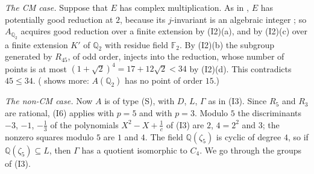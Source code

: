 \documentclass[11pt]{article}
\newcommand{\Q}{\mathbb Q}
\newcommand{\F}{\mathbb F}
\begin{document}
\emph{The CM case.} Suppose that \(E\) has complex multiplication. As in
\cite[Section~4]{P63}, \(E\) has potentially good reduction at \(2\), because its \(j\)-invariant is an
algebraic integer \cite[\S2]{ST}; so \(A_{\Q_2}\) acquires good reduction over a finite extension by
(I2)(a), and by (I2)(c) over a finite extension \(K'\) of \(\Q_2\) with residue field \(\F_2\). By
(I2)(b) the subgroup generated by \(R_{45}\), of odd order, injects into the reduction, whose number
of points is at most \((1+\sqrt2)^4=17+12\sqrt2<34\) by (I2)(d). This contradicts \(45\le34\).
(\cite[Proposition~2]{P30} shows more: \(A(\Q_2)\) has no point of order \(15\).)

\emph{The non-CM case.} Now \(A\) is of type (S), with \(D\), \(L\), \(\Gamma\) as in (I3). Since
\(R_5\) and \(R_3\) are rational, (I6) applies with \(p=5\) and with \(p=3\). Modulo \(5\) the
discriminants \(-3\), \(-1\), \(-\tfrac13\) of the polynomials \(X^2-X+\tfrac1c\) of (I3) are \(2\),
\(4=2^2\) and \(3\); the nonzero squares modulo \(5\) are \(1\) and \(4\). The field \(\Q(\zeta_5)\) is
cyclic of degree \(4\), so if \(\Q(\zeta_5)\subseteq L\), then \(\Gamma\) has a quotient isomorphic
to \(C_4\). We go through the groups of (I3).
\end{document}
